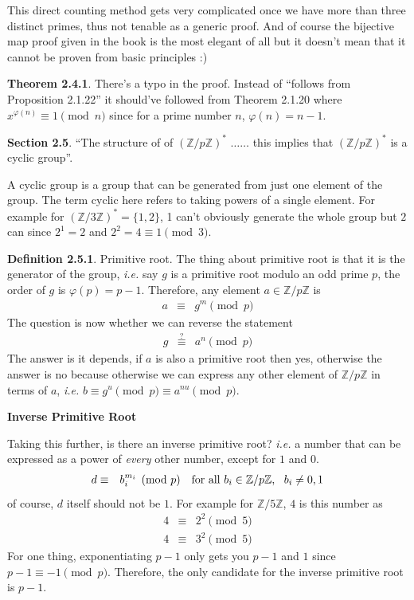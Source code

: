 \documentclass[aps,preprint,preprintnumbers,nofootinbib,showpacs,prd]{revtex4-1}
\newcommand{\ie}{{\it i.e.} }
\newcommand{\nbea}{\begin{eqnarray*}}
\newcommand{\neea}{\end{eqnarray*}}
\begin{document}
This direct counting method gets very complicated once we have more than three distinct primes, thus not tenable as a generic proof. And of course the bijective map proof given in the book is the most elegant of all but it doesn't mean that it cannot be proven from basic principles :) 

{\bf Theorem 2.4.1}. There's a typo in the proof. Instead of ``follows from Proposition 2.1.22'' it should've followed from Theorem 2.1.20 where $x^{\varphi(n)} \equiv 1 \pmod{n}$ since for a prime number $n$, $\varphi(n) = n-1$.

{\bf Section 2.5}. ``The structure of of $(\mathbb{Z}/p\mathbb{Z})^*$ $\dots \dots$ this implies that $(\mathbb{Z}/p\mathbb{Z})^*$ is a cyclic group''.

A cyclic group is a group that can be generated from just one element of the group. The term cyclic here refers to taking powers of a single element. For example for $(\mathbb{Z}/3\mathbb{Z})^* = \{1,2\}$, 1 can't obviously generate the whole group but $2$ can since $2^1 = 2$ and $2^2 = 4 \equiv 1 \pmod{3}$.

{\bf Definition 2.5.1}. Primitive root. The thing about primitive root is that it is the generator of the group, \ie say $g$ is a primitive root modulo an odd prime $p$, the order of $g$ is $\varphi(p) = p-1$. Therefore, any element $a \in \mathbb{Z}/p\mathbb{Z}$ is
%
\nbea
a & \equiv & g^m \pmod{p}
\neea
%
The question is now whether we can reverse the statement
%
\nbea
g & \stackrel{?}{\equiv} & a^n \pmod{p}
\neea
%
The answer is it depends, if $a$ is also a primitive root then yes, otherwise the answer is no because otherwise we can express any other element of $\mathbb{Z}/p\mathbb{Z}$ in terms of $a$, \ie $b \equiv g^u \pmod{p} \equiv a^{nu} \pmod{p}$.

\bigskip
{\bf Inverse Primitive Root}

Taking this further, is there an inverse primitive root? \ie a number that can be expressed as a power of {\it every} other number, except for $1$ and $0$. 
%
\nbea
d & \equiv & b_i^{m_i} \pmod{p}~~~{\rm for~all~} b_i \in \mathbb{Z}/p\mathbb{Z}, ~~b_i \neq 0,1
\neea
%
of course, $d$ itself should not be $1$. For example for $\mathbb{Z}/5\mathbb{Z}$, $4$ is this number as
%
\nbea
4 & \equiv & 2^2 \pmod{5} \\
4 & \equiv & 3^2 \pmod{5}
\neea
%
For one thing, exponentiating $p-1$ only gets you $p-1$ and $1$ since $p-1 \equiv -1 \pmod{p}$. Therefore, the only candidate for the inverse primitive root is $p-1$.
\end{document}

